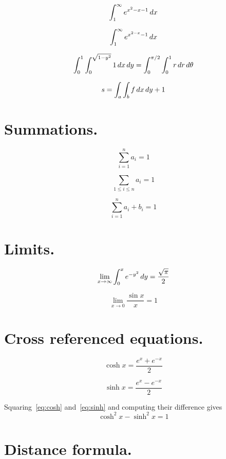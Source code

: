 $$\int_1^\infty e^{x^2-x-1}\,dx$$

$$\int_1^\infty e^{x^{2-x}-1}\,dx$$

$$\int_0^1\int_0^{\sqrt{1 -y^2}}1\,dx\,dy= \int_0^{\pi/2}\int_0^1
r\,dr\,d\theta$$

$$s=\int_a \int_b f \,dx\,dy+1$$



\section{Summations. }

$$\sum_{i=1}^n a_i =1$$

$$\sum_{1\leq i\leq n}a_i =1$$

$$\sum_{i=1}^n a_i + b_i = 1$$



\section{Limits. }

$$\lim_{x \to \infty}\int_0^x e^{-y^2}\,dy = \frac{\sqrt{\pi}}{2}$$

$$\lim_{x\to 0}\frac{\sin x}{x} =1$$



\section{Cross referenced equations. }

\begin{equation}
\cosh x = \frac{e^x + e^{-x} }{2} \label{eq:cosh}
\end{equation}

\begin{equation}
\sinh x = \frac{e^x-e^{-x}}{2} \label{eq:sinh}
\end{equation}

Squaring~\ref{eq:cosh} and~\ref{eq:sinh} and computing their
difference gives
$$\cosh^2x -\sinh^2 x = 1$$



\section{Distance formula. }


